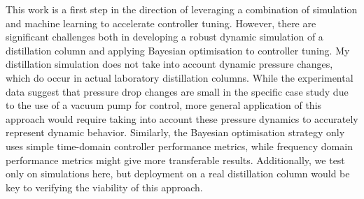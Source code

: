 This work is a first step in the direction of leveraging a combination of simulation and machine learning to accelerate controller tuning. However, there are significant challenges both in developing a robust dynamic simulation of a distillation column and applying Bayesian optimisation to controller tuning. My distillation simulation does not take into account dynamic pressure changes, which do occur in actual laboratory distillation columns. While the experimental data suggest that pressure drop changes are small in the specific case study due to the use of a vacuum pump for control, more general application of this approach would require taking into account these pressure dynamics to accurately represent dynamic behavior. Similarly, the Bayesian optimisation strategy only uses simple time-domain controller performance metrics, while frequency domain performance metrics might give more transferable results. Additionally, we test only on simulations here, but deployment on a real distillation column would be key to verifying the viability of this approach.

